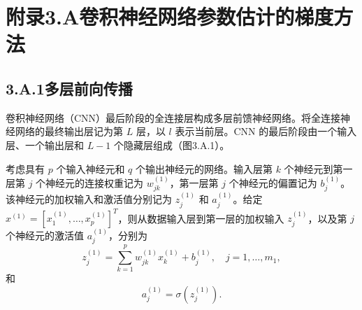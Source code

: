 \section*{附录3.A\quad 卷积神经网络参数估计的梯度方法}
\subsection*{3.A.1\quad 多层前向传播}

卷积神经网络（CNN）最后阶段的全连接层构成多层前馈神经网络。将全连接神经网络的最终输出层记为第 $L$ 层，以 $l$ 表示当前层。CNN 的最后阶段由一个输入层、一个输出层和 $L-1$ 个隐藏层组成（图3.A.1）。

考虑具有 $p$ 个输入神经元和 $q$ 个输出神经元的网络。输入层第 $k$ 个神经元到第一层第 $j$ 个神经元的连接权重记为 $w_{jk}^{(1)}$，第一层第 $j$ 个神经元的偏置记为 $b_j^{(1)}$。该神经元的加权输入和激活值分别记为 $z_j^{(1)}$ 和 $a_j^{(1)}$。给定 $x^{(1)}=[x_1^{(1)},\ldots,x_p^{(1)}]^T$，则从数据输入层到第一层的加权输入 $z_j^{(1)}$，以及第 $j$ 个神经元的激活值 $a_j^{(1)}$，分别为
\begin{equation}
z_j^{(1)}=\sum_{k=1}^{p}w_{jk}^{(1)}x_k^{(1)}+b_j^{(1)},\quad j=1,\ldots,m_1,
\tag{3.A.1}
\end{equation}
和
\begin{equation}
a_j^{(1)}=\sigma(z_j^{(1)}).
\tag{3.A.2}
\end{equation}



